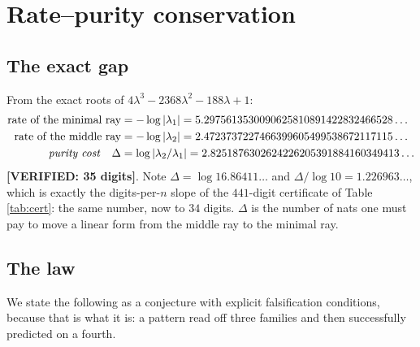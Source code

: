\documentclass[11pt,reqno]{amsart}
\theoremstyle{plain}
\theoremstyle{definition}
\theoremstyle{remark}
\newcommand{\VER}[1]{{\normalfont\sffamily\bfseries[VERIFIED: #1]}}
\begin{document}
\section{Rate--purity conservation}\label{sec:rpc}

\subsection{The exact gap}
From the exact roots of $4\lambda^3-2368\lambda^2-188\lambda+1$:
\[
\begin{aligned}
  \text{rate of the minimal ray} &= -\log|\lambda_1| = 5.2975613530090625810891422832466528\ldots\\
  \text{rate of the middle ray}  &= -\log|\lambda_2| = 2.4723737227466399605499538672117115\ldots\\
  \text{\emph{purity cost}}\quad \Delta &= \log|\lambda_2/\lambda_1|
    = 2.8251876302624226205391884160349413\ldots
\end{aligned}
\]
\VER{35 digits}. Note $\Delta=\log 16.86411\ldots$ and $\Delta/\log10=1.226963\ldots$, which is
exactly the digits-per-$n$ slope of the $441$-digit certificate of Table \ref{tab:cert}: the
same number, now to $34$ digits. $\Delta$ is the number of nats one must pay to move a linear
form from the middle ray to the minimal ray.

\subsection{The law}
We state the following as a conjecture with explicit falsification conditions, because that is
what it is: a pattern read off three families and then successfully predicted on a fourth.
\end{document}

